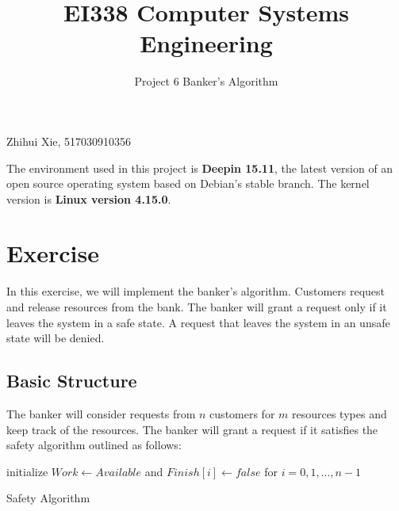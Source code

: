 \documentclass{article}
\title{EI338 Computer Systems Engineering}
\author{Project 6 Banker’s Algorithm}
\begin{document}
\maketitle

\begin{center}
    Zhihui Xie, 517030910356
\end{center}

The environment used in this project is \textbf{Deepin 15.11}, the latest version of an open source operating system based on Debian's stable branch. The kernel version is \textbf{Linux version 4.15.0}.

\section*{Exercise}
In this exercise, we will implement the banker's algorithm. Customers request and release resources from the bank. The banker will grant a request only if it leaves the system in a safe state. A request that leaves the system in an unsafe state will be denied.

\subsection*{Basic Structure}
The banker will consider requests from $n$ customers for $m$ resources types and keep track of the resources. The banker will grant a request if it satisfies the safety algorithm outlined as follows:

\begin{center}
    \begin{minipage}{16cm}
        \begin{algorithm}[H]
            \SetAlgoLined
            initialize $Work \leftarrow Available$ and $Finish[i] \leftarrow false$ for $i=0,1, \ldots, n-1$\;

             {
            }
                
            \caption{Safety Algorithm}
            \label{Safety Algorithm}
        \end{algorithm} 
    \end{minipage}
\end{center}
\end{document}
